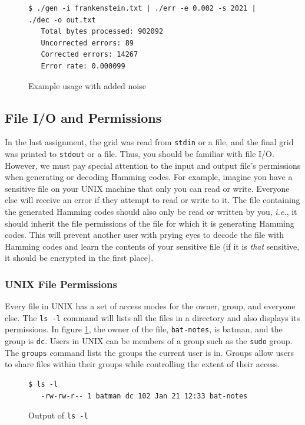 \documentclass[11pt]{article}
\begin{document}
\begin{figure}[h]
\begin{centering}
  \begin{lstlisting}[style=bashstyle]
 $ ./gen -i frankenstein.txt | ./err -e 0.002 -s 2021 | ./dec -o out.txt
   Total bytes processed: 902092
   Uncorrected errors: 89
   Corrected errors: 14267
   Error rate: 0.000099
  \end{lstlisting}
  \caption{Example usage with added noise}
\end{centering}
\end{figure}

\subsection{File I/O and Permissions}
In the last assignment, the grid was read from \texttt{stdin} or a file, and the final grid was printed to
\texttt{stdout} or a file. Thus, you should be familiar with file I/O. However, we must pay special attention
to the input and output file's permissions when generating or decoding Hamming codes. For example, imagine you
have a sensitive file on your \textsc{UNIX} machine that only you can read or write. Everyone else will receive an error if they attempt to read or write to it. The file containing the generated Hamming codes should also only be read or written
by you, \textit{i.e.}, it should inherit the file permissions of the file for which it is generating Hamming
codes. This will prevent another user with prying eyes to decode the file with Hamming codes and learn the
contents of your sensitive file (if it is \emph{that} sensitive, it should be encrypted in the first place).

\subsubsection{\textsc{UNIX} File Permissions}
Every file in \textsc{UNIX} has a set of access modes for the owner, group, and everyone else. The
\texttt{ls -l} command will lists all the files in a directory and also displays its permissions.
In figure \ref{batPerm}, the owner of the file, \texttt{bat-notes}, is batman, and the group is 
\texttt{dc}. Users in \textsc{UNIX} can be members of a group such as the \texttt{sudo} group.
The \texttt{groups} command lists the groups the current user is in.  Groups allow
users to share files within their groups while controlling the extent of their access.

\begin{figure}[h]
\begin{centering}
  \begin{lstlisting}[style=bashstyle]
 $ ls -l
   -rw-rw-r-- 1 batman dc 102 Jan 21 12:33 bat-notes
  \end{lstlisting}
  \caption{Output of \texttt{ls -l}}
  \label{batPerm}
\end{centering}
\end{figure}
\end{document}
